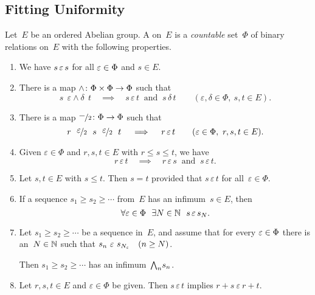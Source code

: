 \documentclass[main.tex]{subfiles}
\begin{document}
\subsection{Fitting Uniformity}
\label{SS:fitting}
%
%
\begin{dfn}
\label{D:uniformity}
Let~$E$ be an ordered Abelian group.
A  on~$E$
is a \emph{countable} set~$\Phi$ of binary relations on~$E$
with the following properties.
\begin{enumerate}
\item 
\label{E-refl}
We have $s \,\varepsilon\, s$ for all $\varepsilon \in \Phi$ and $s \in E$.
\item
\label{E-min}
There is a map $\wedge\colon \Phi\times\Phi \rightarrow \Phi$
such that
\begin{equation*}
s \ \ \varepsilon\wedge\delta\ \   t
\quad\implies\quad
s \,\varepsilon\,t\ \text{ and }\ s\,\delta\,t
\qquad (\varepsilon,\delta\in\Phi,\ s,t\in E).
\end{equation*}

\item
\label{E-half}
There is a map $\smash{\nicefrac{\textstyle{-}}{2}}\colon \Phi \rightarrow \Phi$
such that
\begin{equation*}
r\ \ \dt\varepsilon \ \ s \ \  \dt\varepsilon \ \ t
\quad\implies\quad
r \se t\qquad(\varepsilon\in\Phi,\ r,s,t\in E).
\end{equation*}

\item \label{E-ord}
Given $\varepsilon\in\Phi$ and $r,s,t\in E$ 
with $r\leq s\leq t$,
we have
\begin{equation*}
r\,\varepsilon\,t
\quad\implies\quad
r\,\varepsilon\,s
\ \text{ and }\ 
s\,\varepsilon\,t.
\end{equation*}

\item \label{E-haus}
Let $s,t\in E$ with $s\leq t$.
Then $s=t$ provided that $s\,\varepsilon\,t$ for all~$\varepsilon\in\Phi$.

\item \label{E-inf-conv}
If a sequence $s_1 \geq s_2 \geq \dotsb$ from~$E$
has an infimum~$s\in E$,
then 
\begin{equation*}
\forall\varepsilon\in \Phi
\ \ \exists N\in \mathbb{N}
\ \ s \, \varepsilon\, s_N.
\end{equation*}

\item  \label{E-bound-inf}
Let $s_1\geq s_2 \geq \dotsb$ be a
sequence in~$E$,
and assume that
for every $\varepsilon\in \Phi$
there is an~$N \in \mathbb{N}$ such that 
$s_{n} \ \varepsilon \ s_{N_\varepsilon}\quad (n\geq N)$.

Then $s_1 \geq s_2 \geq \dotsb$ has an infimum~$\textstyle{\bigwedge}_n s_n$.

\item \label{E-add}
Let $r,s,t\in E$ and $\varepsilon\in\Phi$ be given.
Then $s\,\varepsilon\,t$ implies $r+s\ \varepsilon\ r+t$.
\setcounter{epropc}{\value{enumi}}
\end{enumerate}
\end{dfn}
\end{document}
